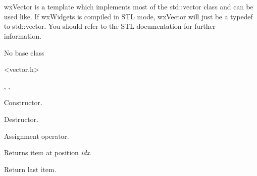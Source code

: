 \section{}\label{wxvector}

wxVector is a template which implements most of the std::vector
class and can be used like. If wxWidgets is compiled in STL mode,
wxVector will just be a typedef to std::vector. You should
refer to the STL documentation for further information.


No base class


<vector.h>


, 
,

\label{wxvectorwxvector}



Constructor.

\label{wxvectordtor}


Destructor.

\label{wxvectoroperatorassign}


Assignment operator.

\label{wxvectorat}



Returns item at position {\it idx}.

\label{wxvectorback}



Return last item.

\label{wxvectorbegin}

